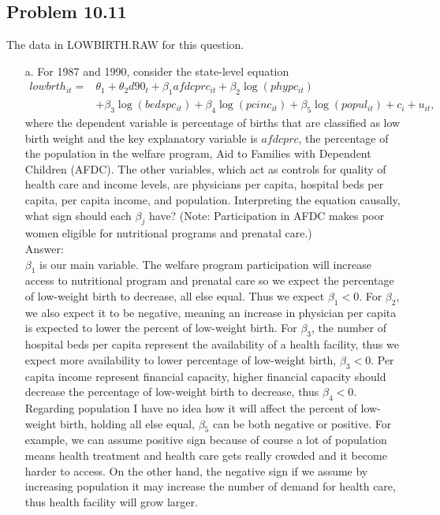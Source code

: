 \documentclass[10pt]{article}
\begin{document}
\subsection*{Problem 10.11}
The data in LOWBIRTH.RAW for this question. 
\begin{enumerate}
\item[a.] For 1987 and 1990, consider the state-level equation 
\begin{align*}
    lowbrth_{it}=&\theta_1+\theta_2d90_t+\beta_1afdcprc_{it}+\beta_2\log(phypc_{it})\\
    &+\beta_3\log(bedspc_{it})+\beta_4\log(pcinc_{it})+\beta_5\log(popul_{it})+c_i+u_{it},
\end{align*} 
where the dependent variable is percentage of births that are classified as low birth weight and the key explanatory variable is $afdcprc$, the percentage of the population in the welfare program, Aid to Families with Dependent Children (AFDC). The other variables, which act as controls for quality of health care and income levels, are physicians per capita, hospital beds per capita, per capita income, and population. Interpreting the equation causally, what sign should each $\beta_j$ have? (Note: Participation in AFDC makes poor women eligible for nutritional programs and prenatal care.) 
\\ Answer: \\
$\beta_1$ is our main variable. The welfare program participation will increase access to nutritional program and prenatal care so we expect the percentage of low-weight birth to decrease, all else equal. Thus we expect $\beta_1<0.$ For $\beta_2$, we also expect it to be negative, meaning an increase in physician per capita is expected to lower the percent of low-weight birth. For $\beta_3$, the number of hospital beds per capita represent the availability of a health facility, thus we expect more availability to lower percentage of low-weight birth, $\beta_3<0$. Per capita income represent financial capacity, higher financial capacity should decrease the percentage of low-weight birth to decrease, thus $\beta_4<0$. Regarding population I have no idea how it will affect the percent of low-weight birth, holding all else equal, $\beta_5$ can be both negative or positive. For example, we can assume positive sign because of course a lot of population means health treatment and health care gets really crowded and it become harder to access. On the other hand, the negative sign if we assume by increasing population it may increase the number of demand for health care, thus health facility will grow larger.


\end{enumerate}
\end{document}
